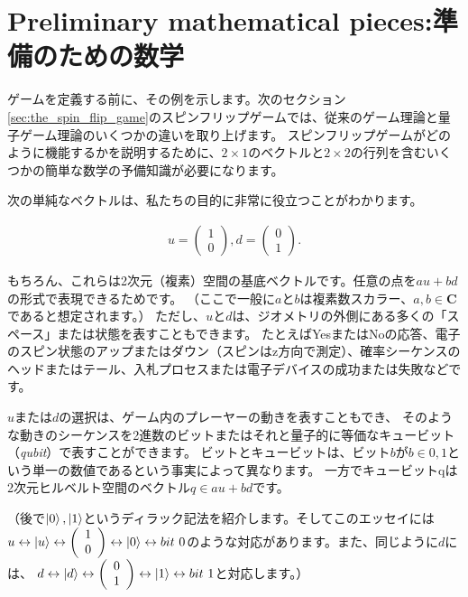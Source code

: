 \section{Preliminary mathematical pieces:準備のための数学}

ゲームを定義する前に、その例を示します。次のセクション\ref{sec:the_spin_flip_game}のスピンフリップゲームでは、従来のゲーム理論と量子ゲーム理論のいくつかの違いを取り上げます。
スピンフリップゲームがどのように機能するかを説明するために、$2 \times 1$のベクトルと$2 \times 2$の行列を含むいくつかの簡単な数学の予備知識が必要になります。

次の単純なベクトルは、私たちの目的に非常に役立つことがわかります。

\begin{align}
u = \left(  
\begin{array}{ccc}
 1 \\
 0 
\end{array}
\right) 
,
d = \left(  
\begin{array}{ccc}
 0 \\
 1 
\end{array}
\right).
\end{align}

もちろん、これらは2次元（複素）空間の基底ベクトルです。任意の点を$au + bd$の形式で表現できるためです。
（ここで一般に$a$と$b$は複素数スカラー、$a,b \in \mathbf{C}$であると想定されます。）
ただし、$u$と$d$は、ジオメトリの外側にある多くの「スペース」または状態を表すこともできます。
たとえばYesまたはNoの応答、電子のスピン状態のアップまたはダウン（スピンはz方向で測定）、確率シーケンスのヘッドまたはテール、入札プロセスまたは電子デバイスの成功または失敗などです。

$u$または$d$の選択は、ゲーム内のプレーヤーの動きを表すこともでき、
そのような動きのシーケンスを2進数のビットまたはそれと量子的に等価なキュービット（\textit{qubit}）で表すことができます。
ビットとキュービットは、ビット$b$が$b \in {0,1}$という単一の数値であるという事実によって異なります。
一方でキュービットqは2次元ヒルベルト空間のベクトル$q \in {au + bd}$です。

（後で$\ket{0},\ket{1}$というディラック記法を紹介します。そしてこのエッセイには $u \leftrightarrow \ket{u} \leftrightarrow \left(  
\begin{array}{ccc}
 1 \\
 0 
\end{array}
\right) \leftrightarrow \ket{0} \leftrightarrow bit \ 0$のような対応があります。また、同じように$d$には、
$ d \leftrightarrow \ket{d} \leftrightarrow \left(  
\begin{array}{ccc}
 0 \\
 1 
\end{array}
\right) \leftrightarrow \ket{1} \leftrightarrow bit \ 1 $と対応します。）

